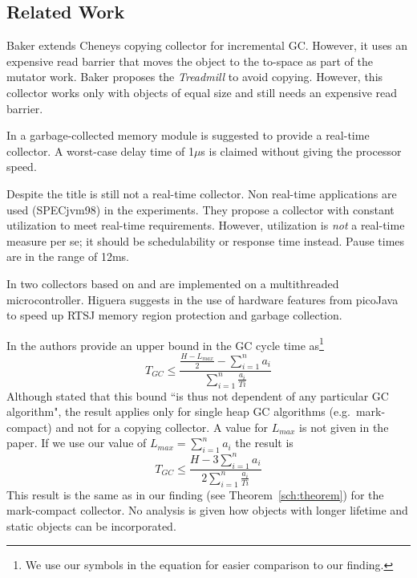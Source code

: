 \subsection{Related Work}

Baker \cite{gc:baker78} extends Cheneys \cite{gc:cheney70} copying
collector for incremental GC. However, it uses an expensive read
barrier that moves the object to the to-space as part of the mutator
work. Baker proposes the \emph{Treadmill} \cite{gc:baker92} to avoid
copying. However, this collector works only with objects of equal
size and still needs an expensive read barrier.

In \cite{gc:hwgc94} a garbage-collected memory module is suggested to
provide a real-time collector. A worst-case delay time of 1$\mu$s is
claimed without giving the processor speed.

Despite the title \cite{gc:bacon03} is still not a real-time
collector. Non real-time applications are used (SPECjvm98) in the
experiments. They propose a collector with constant utilization to
meet real-time requirements. However, utilization is \emph{not} a
real-time measure per se; it should be schedulability or response
time instead. Pause times are in the range of 12ms.

In \cite{gc:pfeffer04} two collectors based on \cite{gc:dijkstra78}
and \cite{gc:baker92} are implemented on a multithreaded
microcontroller.  Higuera suggests in \cite{gc:higu02} the use of
hardware features from picoJava to speed up RTSJ memory region
protection and garbage collection.

In \cite{780745} the authors provide an upper bound in the GC cycle
time as\footnote{We use our symbols in the equation for easier
comparison to our finding.}
%
\begin{equation}
\nonumber
    T_{GC} \le \frac{\frac{H-L_{max}}{2}-\sum_{i=1}^{n} a_i}{\sum_{i=1}^{n} \frac{a_i}{Ti}}
\end{equation}
%
Although stated that this bound ``is thus not dependent of any
particular GC algorithm", the result applies only for single heap GC
algorithms (e.g.\ mark-compact) and not for a copying collector. A
value for $L_{max}$ is not given in the paper. If we use our value
of $L_{max} =\sum_{i=1}^{n} a_i$ the result is
%
\begin{equation}
\nonumber
    T_{GC} \le \frac{H-3\sum_{i=1}^{n} a_i}{2\sum_{i=1}^{n} \frac{a_i}{Ti}}
\end{equation}
%
This result is the same as in our finding (see
Theorem~\ref{sch:theorem}) for the mark-compact collector. No
analysis is given how objects with longer lifetime and static
objects can be incorporated.
